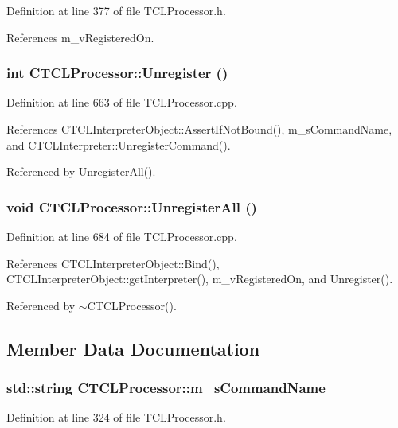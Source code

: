 Definition at line 377 of file TCLProcessor.h.

References m\_\-v\-Registered\-On.
\subsubsection{\setlength{\rightskip}{0pt plus 5cm}int CTCLProcessor::Unregister ()}\label{classCTCLProcessor_a16}




Definition at line 663 of file TCLProcessor.cpp.

References CTCLInterpreter\-Object::Assert\-If\-Not\-Bound(), m\_\-s\-Command\-Name, and CTCLInterpreter::Unregister\-Command().

Referenced by Unregister\-All().
\subsubsection{\setlength{\rightskip}{0pt plus 5cm}void CTCLProcessor::Unregister\-All ()}\label{classCTCLProcessor_a17}




Definition at line 684 of file TCLProcessor.cpp.

References CTCLInterpreter\-Object::Bind(), CTCLInterpreter\-Object::get\-Interpreter(), m\_\-v\-Registered\-On, and Unregister().

Referenced by $\sim$CTCLProcessor().

\subsection{Member Data Documentation}
\subsubsection{\setlength{\rightskip}{0pt plus 5cm}std::string CTCLProcessor::m\_\-s\-Command\-Name\hspace{0.3cm}{\tt  [private]}}\label{classCTCLProcessor_o0}




Definition at line 324 of file TCLProcessor.h.

